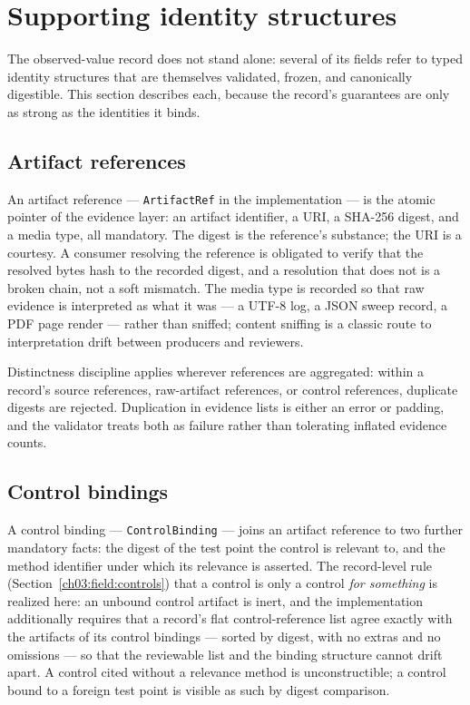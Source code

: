\section{Supporting identity structures}\label{ch03:identities}

The observed-value record does not stand alone: several of its fields refer to typed identity structures that are themselves validated, frozen, and canonically digestible. This section describes each, because the record's guarantees are only as strong as the identities it binds.

\subsection{Artifact references}\label{ch03:id:artifact}

An artifact reference --- \texttt{ArtifactRef} in the implementation --- is the atomic pointer of the evidence layer: an artifact identifier, a URI, a SHA-256 digest, and a media type, all mandatory. The digest is the reference's substance; the URI is a courtesy. A consumer resolving the reference is obligated to verify that the resolved bytes hash to the recorded digest, and a resolution that does not is a broken chain, not a soft mismatch. The media type is recorded so that raw evidence is interpreted as what it was --- a UTF-8 log, a JSON sweep record, a PDF page render --- rather than sniffed; content sniffing is a classic route to interpretation drift between producers and reviewers.

Distinctness discipline applies wherever references are aggregated: within a record's source references, raw-artifact references, or control references, duplicate digests are rejected. Duplication in evidence lists is either an error or padding, and the validator treats both as failure rather than tolerating inflated evidence counts.

\subsection{Control bindings}\label{ch03:id:controlbinding}

A control binding --- \texttt{ControlBinding} --- joins an artifact reference to two further mandatory facts: the digest of the test point the control is relevant to, and the method identifier under which its relevance is asserted. The record-level rule (Section~\ref{ch03:field:controls}) that a control is only a control \emph{for something} is realized here: an unbound control artifact is inert, and the implementation additionally requires that a record's flat control-reference list agree exactly with the artifacts of its control bindings --- sorted by digest, with no extras and no omissions --- so that the reviewable list and the binding structure cannot drift apart. A control cited without a relevance method is unconstructible; a control bound to a foreign test point is visible as such by digest comparison.

